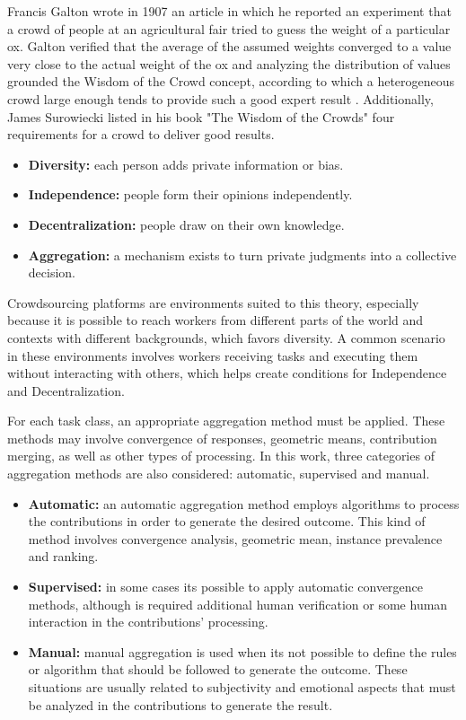 Francis Galton wrote in 1907 an article in which he reported an experiment that a crowd of people at an agricultural fair tried to guess the weight of a particular ox. Galton verified that the average of the assumed weights converged to a value very close to the actual weight of the ox and analyzing the distribution of values grounded the Wisdom of the Crowd concept, according to which a heterogeneous crowd large enough tends to provide such a good expert result \cite{GALTON1907}. Additionally, James Surowiecki listed in his book "The Wisdom of the Crowds" \cite{surowiecki2005wisdom} four requirements for a crowd to deliver good results.

\begin{itemize}
\item{\textbf{Diversity:}} each person adds private information or bias.
\item{\textbf{Independence:}} people form their opinions independently.
\item{\textbf{Decentralization:}} people draw on their own knowledge.
\item{\textbf{Aggregation:}} a mechanism exists to turn private judgments into a collective decision.
\end{itemize}

Crowdsourcing platforms are environments suited to this theory, especially because it is possible to reach workers from different parts of the world and contexts with different backgrounds, which favors diversity. A common scenario in these environments involves workers receiving tasks and executing them without interacting with others, which helps create conditions for Independence and Decentralization.

For each task class, an appropriate aggregation method must be applied. These methods may involve convergence of responses, geometric means, contribution merging, as well as other types of processing. In this work, three categories of aggregation methods are also considered: automatic, supervised and manual.

\begin{itemize}

\item{\textbf{Automatic:}} an automatic aggregation method employs  algorithms to process the contributions in order to generate the desired outcome. This kind of method involves convergence analysis, geometric mean, instance prevalence and ranking. 

\item{\textbf{Supervised:}} in some cases its possible to apply automatic convergence methods, although is required additional human verification or some human interaction in the contributions' processing. 

\item{\textbf{Manual:}} manual aggregation is used when its not possible to define the rules or algorithm that should be followed to generate the outcome. These situations are usually related to subjectivity and emotional aspects that must be analyzed in the contributions to generate the result.

\end{itemize}
